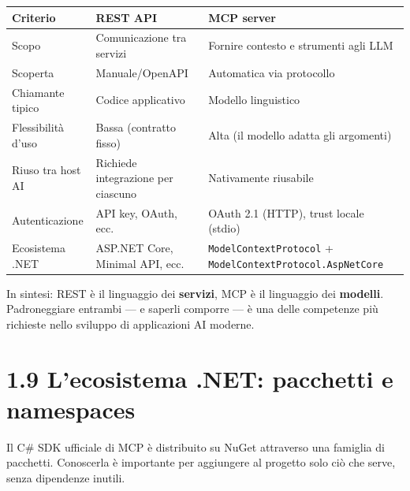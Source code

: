 \documentclass[
  italian,
  10pt,
]{book}
\newcounter{none} %
\begin{document}
{\def\LTcaptype{none} %
\begin{longtable}[]{@{}
  >{\raggedright\arraybackslash}p{}
  >{\raggedright\arraybackslash}p{}
  >{\raggedright\arraybackslash}p{}@{}}
\toprule\noalign{}
\begin{minipage}[b]{\linewidth}\raggedright
Criterio
\end{minipage} & \begin{minipage}[b]{\linewidth}\raggedright
REST API
\end{minipage} & \begin{minipage}[b]{\linewidth}\raggedright
MCP server
\end{minipage} \\
\midrule\noalign{}
\endhead
\bottomrule\noalign{}
\endlastfoot
Scopo & Comunicazione tra servizi & Fornire contesto e strumenti agli
LLM \\
Scoperta & Manuale/OpenAPI & Automatica via protocollo \\
Chiamante tipico & Codice applicativo & Modello linguistico \\
Flessibilità d'uso & Bassa (contratto fisso) & Alta (il modello adatta
gli argomenti) \\
Riuso tra host AI & Richiede integrazione per ciascuno & Nativamente
riusabile \\
Autenticazione & API key, OAuth, ecc. & OAuth 2.1 (HTTP), trust locale
(stdio) \\
Ecosistema .NET & ASP.NET Core, Minimal API, ecc. &
\texttt{ModelContextProtocol} +
\texttt{ModelContextProtocol.AspNetCore} \\
\end{longtable}
}

In sintesi: REST è il linguaggio dei \textbf{servizi}, MCP è il
linguaggio dei \textbf{modelli}. Padroneggiare entrambi --- e saperli
comporre --- è una delle competenze più richieste nello sviluppo di
applicazioni AI moderne.

\section{1.9 L'ecosistema .NET: pacchetti e
namespaces}\label{lecosistema-.net-pacchetti-e-namespaces}

Il C\# SDK ufficiale di MCP è distribuito su NuGet attraverso una
famiglia di pacchetti. Conoscerla è importante per aggiungere al
progetto solo ciò che serve, senza dipendenze inutili.
\end{document}
